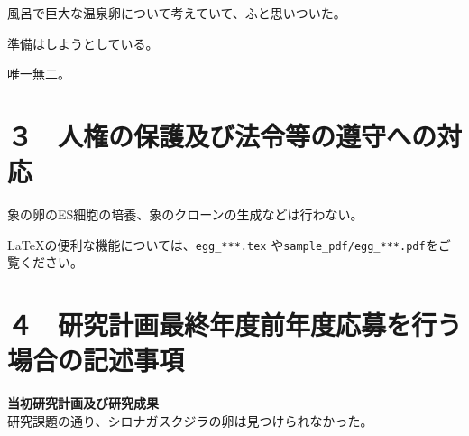 \documentclass[11pt,a4j,dvipdfmx]{jarticle} 					%
\newcommand{\研究課題名}{象の卵}
\newcommand{\研究機関名}{逢坂大学}
\newcommand{\研究代表者氏名}{湯川秀樹}
\newcommand{\研究期間の最終元号年度}{7}  %
\begin{document}
		風呂で巨大な温泉卵について考えていて、ふと思いついた。

	準備はしようとしている。

	唯一無二。




\section{３　人権の保護及び法令等の遵守への対応}

	象の卵のES細胞の培養、象のクローンの生成などは行わない。

	\LaTeX の便利な機能については、\texttt{egg\_***.tex} や\texttt{sample\_pdf/egg\_***.pdf}をご覧ください。




\section{４　研究計画最終年度前年度応募を行う場合の記述事項}

\newcommand{\最終年度研究種目名}{基盤研究（Z）}
\newcommand{\最終年度研究課題番号}{99999}
\newcommand{\最終年度研究課題名}{シロナガスクジラの卵はなぜ見つけられないのか}
\newcommand{\最終年度研究期間}{平成25年度〜令和\一年目 年度}


\noindent
\textbf{当初研究計画及び研究成果}\\
	研究課題の通り、シロナガスクジラの卵は見つけられなかった。
\\
\end{document}
